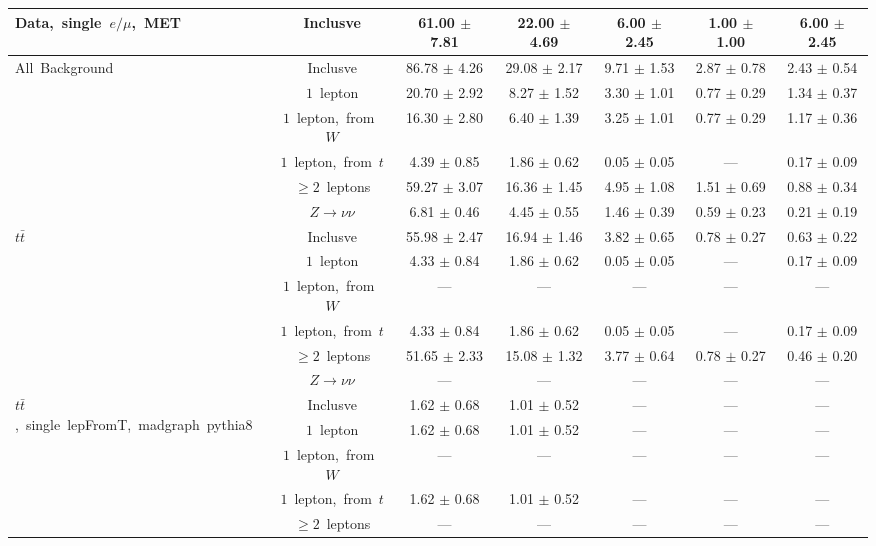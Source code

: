 \documentclass{article}
\begin{document}
\begin{longtable}{|l|c|c|c|c|c|c|}
\multirow{1}{*}{Data,~single~$e/\mu$,~MET} & Inclusve  & 61.00 $\pm$ 7.81  & 22.00 $\pm$ 4.69  & 6.00 $\pm$ 2.45  & 1.00 $\pm$ 1.00  & 6.00 $\pm$ 2.45 \\* 
\hline \hline 
\multirow{6}{*}{All~Background} & Inclusve  & 86.78 $\pm$ 4.26  & 29.08 $\pm$ 2.17  & 9.71 $\pm$ 1.53  & 2.87 $\pm$ 0.78  & 2.43 $\pm$ 0.54 \\* 
 & $1$~lepton  & 20.70 $\pm$ 2.92  & 8.27 $\pm$ 1.52  & 3.30 $\pm$ 1.01  & 0.77 $\pm$ 0.29  & 1.34 $\pm$ 0.37 \\* 
 & $1$~lepton,~from~$W$  & 16.30 $\pm$ 2.80  & 6.40 $\pm$ 1.39  & 3.25 $\pm$ 1.01  & 0.77 $\pm$ 0.29  & 1.17 $\pm$ 0.36 \\* 
 & $1$~lepton,~from~$t$  & 4.39 $\pm$ 0.85  & 1.86 $\pm$ 0.62  & 0.05 $\pm$ 0.05  & ---  & 0.17 $\pm$ 0.09 \\* 
 & $\ge2$~leptons  & 59.27 $\pm$ 3.07  & 16.36 $\pm$ 1.45  & 4.95 $\pm$ 1.08  & 1.51 $\pm$ 0.69  & 0.88 $\pm$ 0.34 \\* 
 & $Z\rightarrow\nu\nu$  & 6.81 $\pm$ 0.46  & 4.45 $\pm$ 0.55  & 1.46 $\pm$ 0.39  & 0.59 $\pm$ 0.23  & 0.21 $\pm$ 0.19 \\* 
\hline 
\multirow{6}{*}{$t\bar{t}$} & Inclusve  & 55.98 $\pm$ 2.47  & 16.94 $\pm$ 1.46  & 3.82 $\pm$ 0.65  & 0.78 $\pm$ 0.27  & 0.63 $\pm$ 0.22 \\* 
 & $1$~lepton  & 4.33 $\pm$ 0.84  & 1.86 $\pm$ 0.62  & 0.05 $\pm$ 0.05  & ---  & 0.17 $\pm$ 0.09 \\* 
 & $1$~lepton,~from~$W$  & ---  & ---  & ---  & ---  & --- \\* 
 & $1$~lepton,~from~$t$  & 4.33 $\pm$ 0.84  & 1.86 $\pm$ 0.62  & 0.05 $\pm$ 0.05  & ---  & 0.17 $\pm$ 0.09 \\* 
 & $\ge2$~leptons  & 51.65 $\pm$ 2.33  & 15.08 $\pm$ 1.32  & 3.77 $\pm$ 0.64  & 0.78 $\pm$ 0.27  & 0.46 $\pm$ 0.20 \\* 
 & $Z\rightarrow\nu\nu$  & ---  & ---  & ---  & ---  & --- \\* 
\hline 
\multirow{6}{*}{$t\bar{t}$,~single~lepFromT,~madgraph~pythia8} & Inclusve  & 1.62 $\pm$ 0.68  & 1.01 $\pm$ 0.52  & ---  & ---  & --- \\* 
 & $1$~lepton  & 1.62 $\pm$ 0.68  & 1.01 $\pm$ 0.52  & ---  & ---  & --- \\* 
 & $1$~lepton,~from~$W$  & ---  & ---  & ---  & ---  & --- \\* 
 & $1$~lepton,~from~$t$  & 1.62 $\pm$ 0.68  & 1.01 $\pm$ 0.52  & ---  & ---  & --- \\* 
 & $\ge2$~leptons  & ---  & ---  & ---  & ---  & --- \\* 

\end{longtable}
\end{document}

